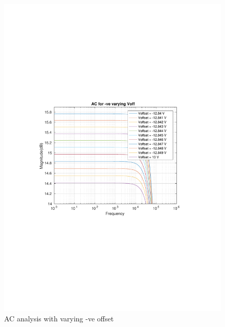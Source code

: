 \documentclass[12pt,a4paper,UKenglish]{article}
\begin{document}
\begin{figure} [htbp]
  \centering 
  \includegraphics[width=\textwidth]{img/1c_neg_offset.pdf} 
  \caption{AC analysis with varying -ve offset}
  \label{ac_neg} 
\end{figure}

\end{document}
